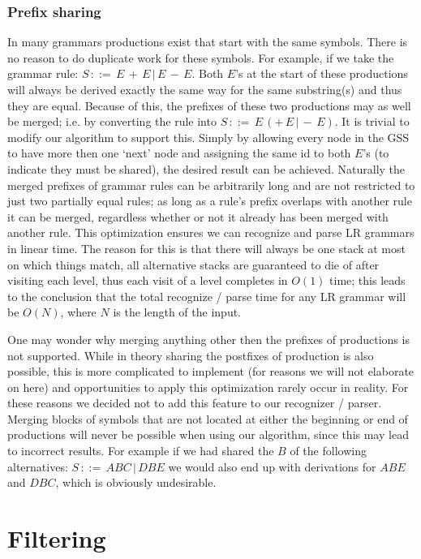 \documentclass[a4paper,10pt]{article}
\begin{document}
\subsubsection{Prefix sharing}
\label{sec:prefixSharing}
In many grammars productions exist that start with the same symbols. There is no reason to do duplicate work for these symbols. For example, if we take the grammar rule: $S\,::=\,E\,+\,E\,|\,E\,-\,E$. Both $E$'s at the start of these productions will always be derived exactly the same way for the same substring(s) and thus they are equal. Because of this, the prefixes of these two productions may as well be merged; i.e. by converting the rule into $S\,::=\,E\,(+\,E\,|\,-\,E)$. It is trivial to modify our algorithm to support this. Simply by allowing every node in the GSS to have more then one `next' node and assigning the same id to both $E$'s (to indicate they must be shared), the desired result can be achieved. Naturally the merged prefixes of grammar rules can be arbitrarily long and are not restricted to just two partially equal rules; as long as a rule's prefix overlaps with another rule it can be merged, regardless whether or not it already has been merged with another rule. This optimization ensures we can recognize and parse LR grammars in linear time. The reason for this is that there will always be one stack at most on which things match, all alternative stacks are guaranteed to die of after visiting each level, thus each visit of a level completes in $O(1)$ time; this leads to the conclusion that the total recognize / parse time for any LR grammar will be $O(N)$, where $N$ is the length of the input.

One may wonder why merging anything other then the prefixes of productions is not supported. While in theory sharing the postfixes of production is also possible, this is more complicated to implement (for reasons we will not elaborate on here) and opportunities to apply this optimization rarely occur in reality. For these reasons we decided not to add this feature to our recognizer / parser. Merging blocks of symbols that are not located at either the beginning or end of productions will never be possible when using our algorithm, since this may lead to incorrect results. For example if we had shared the $B$ of the following alternatives: $S\,::=\,ABC\,|\,DBE$ we would also end up with derivations for $ABE$ and $DBC$, which is obviously undesirable.

\section{Filtering}
\end{document}
